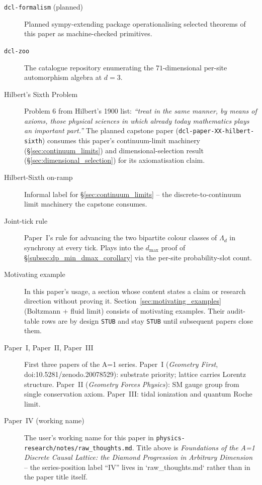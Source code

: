 \begin{description}
\item[\texttt{dcl-formalism} (planned)]
   Planned sympy-extending package operationalising selected theorems
   of this paper as machine-checked primitives.

\item[\texttt{dcl-zoo}]
   The catalogue repository enumerating the $71$-dimensional per-site
   automorphism algebra at $d = 3$.

\item[Hilbert's Sixth Problem]
   Problem 6 from Hilbert's 1900 list: \emph{``treat in the same
   manner, by means of axioms, those physical sciences in which
   already today mathematics plays an important part.''}  The planned
   capstone paper (\texttt{dcl-paper-XX-hilbert-sixth}) consumes
   this paper's continuum-limit machinery
   (\S\ref{sec:continuum_limits}) and dimensional-selection result
   (\S\ref{sec:dimensional_selection}) for its axiomatisation
   claim.

\item[Hilbert-Sixth on-ramp]
   Informal label for \S\ref{sec:continuum_limits} -- the
   discrete-to-continuum limit machinery the capstone consumes.

\item[Joint-tick rule]
   Paper~I's rule for advancing the two bipartite colour classes of
   $\Lambda_d$ in synchrony at every tick.  Plays into the
   $d_\max$ proof of \S\ref{subsec:dp_min_dmax_corollary} via the
   per-site probability-slot count.

\item[Motivating example]
   In this paper's usage, a section whose content states a claim or
   research direction without proving it.
   Section~\ref{sec:motivating_examples} (Boltzmann + fluid limit)
   consists of motivating examples.  Their audit-table rows are by
   design \texttt{STUB} and stay \texttt{STUB} until subsequent
   papers close them.

\item[Paper~I, Paper~II, Paper~III]
   First three papers of the A=1 series.  Paper~I (\emph{Geometry
   First}, doi:10.5281/zenodo.20078529): substrate priority; lattice
   carries Lorentz structure.  Paper~II (\emph{Geometry Forces
   Physics}): SM gauge group from single conservation axiom.
   Paper~III: tidal ionization and quantum Roche limit.

\item[Paper~IV (working name)]
   The user's working name for this paper in
   \texttt{physics-research/notes/raw\_thoughts.md}.  Title above is
   \emph{Foundations of the A=1 Discrete Causal Lattice: the Diamond
   Progression in Arbitrary Dimension} -- the series-position label
   ``IV'' lives in `raw\_thoughts.md` rather than in the paper title
   itself.
\end{description}

